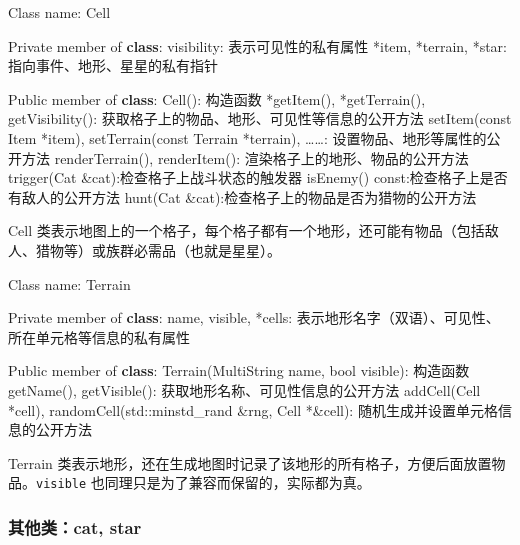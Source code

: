 \documentclass[hyperref,UTF8,a4paper]{ctexart}
\newenvironment{Shaded}{}{}
\newcommand{\AttributeTok}[1]{\textcolor[rgb]{0.49,0.56,0.16}{#1}}
\newcommand{\BuiltInTok}[1]{#1}
\newcommand{\DataTypeTok}[1]{\textcolor[rgb]{0.56,0.13,0.00}{#1}}
\newcommand{\KeywordTok}[1]{\textcolor[rgb]{0.00,0.44,0.13}{\textbf{#1}}}
\newcommand{\NormalTok}[1]{#1}
\begin{document}
\begin{Shaded}
\begin{Highlighting}[]
\NormalTok{Class name: Cell}

\NormalTok{Private member of }\KeywordTok{class}\NormalTok{:}
\NormalTok{    visibility: 表示可见性的私有属性}
\NormalTok{    *item, *terrain, *star: 指向事件、地形、星星的私有指针}

\NormalTok{Public member of }\KeywordTok{class}\NormalTok{:}
\NormalTok{    Cell(): 构造函数}
\NormalTok{    *getItem(), *getTerrain(), getVisibility(): 获取格子上的物品、地形、可见性等信息的公开方法}
\NormalTok{    setItem(}\AttributeTok{const}\NormalTok{ Item *item), setTerrain(}\AttributeTok{const}\NormalTok{ Terrain *terrain), ……: 设置物品、地形等属性的公开方法}
\NormalTok{    renderTerrain(), renderItem(): 渲染格子上的地形、物品的公开方法}
\NormalTok{    trigger(Cat &cat):检查格子上战斗状态的触发器}
\NormalTok{    isEnemy() }\AttributeTok{const}\NormalTok{:检查格子上是否有敌人的公开方法}
\NormalTok{    hunt(Cat &cat):检查格子上的物品是否为猎物的公开方法}
\end{Highlighting}
\end{Shaded}

Cell
类表示地图上的一个格子，每个格子都有一个地形，还可能有物品（包括敌人、猎物等）或族群必需品（也就是星星）。

\begin{Shaded}
\begin{Highlighting}[]
\NormalTok{Class name: Terrain}

\NormalTok{Private member of }\KeywordTok{class}\NormalTok{:}
\NormalTok{    name, visible, *cells: 表示地形名字（双语）、可见性、所在单元格等信息的私有属性}

\NormalTok{Public member of }\KeywordTok{class}\NormalTok{:}
\NormalTok{    Terrain(MultiString name, }\DataTypeTok{bool}\NormalTok{ visible): 构造函数}
\NormalTok{    getName(), getVisible(): 获取地形名称、可见性信息的公开方法}
\NormalTok{    addCell(Cell *cell), randomCell(}\BuiltInTok{std::}\NormalTok{minstd_rand &rng, Cell *&cell): 随机生成并设置单元格信息的公开方法}
\end{Highlighting}
\end{Shaded}

Terrain
类表示地形，还在生成地图时记录了该地形的所有格子，方便后面放置物品。\texttt{visible}
也同理只是为了兼容而保留的，实际都为真。

\hypertarget{ux5176ux4ed6ux7c7bcat-star}{%
\subsubsection{其他类：cat, star}\label{ux5176ux4ed6ux7c7bcat-star}}
\end{document}
